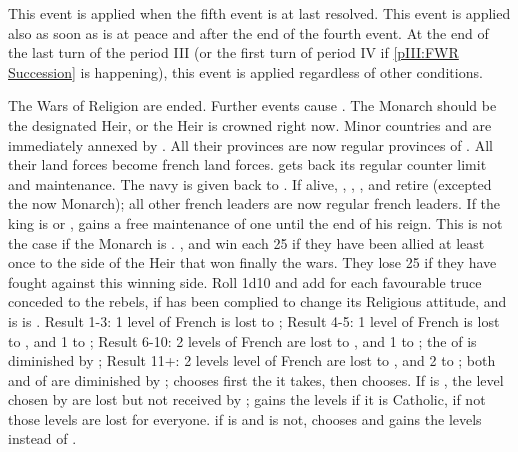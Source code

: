 
\activation{}
\aparag This event is applied when the fifth event  is at last
resolved.
\aparag This event is applied also as soon as \FRA is at peace and \CATHCO
after the end of the fourth event.
\aparag At the end of the last turn of the period III (or the first turn of
period IV if \ref{pIII:FWR Succession} is happening), this event is applied
regardless of other conditions.

\phinter
\aparag The Wars of Religion are ended. Further events 
cause \RD.
\aparag The Monarch should be the designated Heir, or the Heir is crowned
right now.
\aparag Minor countries \hug and \lig are immediately annexed by \FRA. All
their provinces are now regular provinces of \FRA. All their land forces
become french land forces. \FRA gets back its regular counter limit and
maintenance.  The navy is given back to \FRA. If alive, \leaderConde,
\leaderColigny, \leaderMayenne, \leaderNavarre and 
retire (excepted the now Monarch); all other french leaders are now regular
french leaders.
\aparag If the king is  or , \FRA
gains a free maintenance of one \ARMY \faceplus until the end of his
reign. This is not the case if the Monarch is .
\ENG, \HOL and \SPA win each 25 \PV if they have been allied at least once to
the side of the Heir that won finally the wars. They lose 25 \PV if they have
fought against this winning side.
 Roll 1d10 and add  for each
favourable truce conceded to the rebels,  if \FRA has been complied
to change its Religious attitude, and  is \FRA is \CATHCR.
\bparag Result 1-3: 1 level of French \TradeFLEET is lost to \HOL;
\bparag Result 4-5: 1 level of French \TradeFLEET is lost to \HOL, and 1 to
\ENG;
\bparag Result 6-10: 2 levels of French \TradeFLEET are lost to \HOL, and 1 to
\ENG; the \FTI of \FRA is diminished by ;
\bparag Result 11+: 2 levels level of French \TradeFLEET are lost to \HOL, and
2 to \ENG; both \FTI and \DTI of \FRA are diminished by ;
\bparag \HOL chooses first the \TradeFLEET it takes, then \ENG chooses.
\bparag If \FRA is \CATHCR, the level chosen by \HOL are lost but not received
by \HOL; \ENG gains the levels if it is Catholic, if not those levels are lost
for everyone.
\bparag if \ENG is \CATHCR and \FRA is not, \SUE chooses and gains the levels
instead of \ENG.
